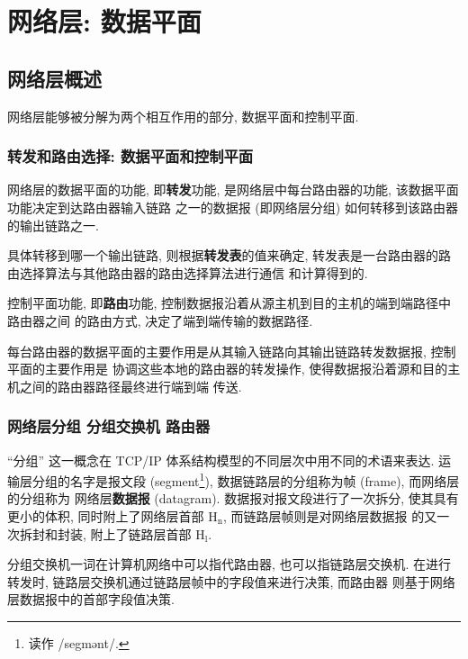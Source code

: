 \documentclass[10pt,UTF8]{book} %
\begin{document}
\newpage
\thispagestyle{empty}

\chapter{网络层: 数据平面}



\section{网络层概述}

网络层能够被分解为两个相互作用的部分, 数据平面和控制平面.

\subsection{转发和路由选择: 数据平面和控制平面}

网络层的数据平面的功能, 即\textbf{转发}功能, 是网络层中每台路由器的功能, 该数据平面功能决定到达路由器输入链路
之一的数据报 (即网络层分组) 如何转移到该路由器的输出链路之一.

具体转移到哪一个输出链路,
则根据\textbf{转发表}的值来确定, 转发表是一台路由器的路由选择算法与其他路由器的路由选择算法进行通信
和计算得到的.

控制平面功能, 即\textbf{路由}功能, 控制数据报沿着从源主机到目的主机的端到端路径中路由器之间
的路由方式, 决定了端到端传输的数据路径.

每台路由器的数据平面的主要作用是从其输入链路向其输出链路转发数据报, 控制平面的主要作用是
协调这些本地的路由器的转发操作, 使得数据报沿着源和目的主机之间的路由器路径最终进行端到端
传送.

\subsection{网络层分组 \quad 分组交换机 \quad 路由器}

“分组” 这一概念在 TCP/IP 体系结构模型的不同层次中用不同的术语来表达.
运输层分组的名字是报文段 (segment\footnote{
    读作 /segmənt/.
}), 数据链路层的分组称为帧 (frame), 而网络层的分组称为
网络层\textbf{数据报} (datagram). 数据报对报文段进行了一次拆分, 使其具有
更小的体积, 同时附上了网络层首部 $\mathrm{H_n}$, 而链路层帧则是对网络层数据报
的又一次拆封和封装, 附上了链路层首部 $\mathrm{H_l}$.

分组交换机一词在计算机网络中可以指代路由器, 也可以指链路层交换机.
在进行转发时, 链路层交换机通过链路层帧中的字段值来进行决策, 而路由器
则基于网络层数据报中的首部字段值决策.
\end{document}
